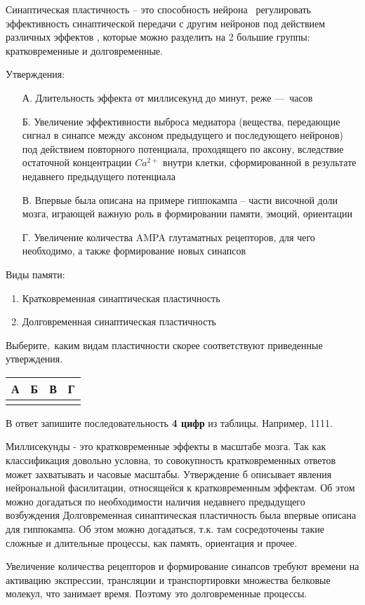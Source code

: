 
Синаптическая пластичность – это способность нейрона  регулировать эффективность синаптической передачи с другим нейронов под действием различных эффектов , которые можно разделить на 2 большие группы: кратковременные и долговременные.

Утверждения:
\begin{enumerate}
    \item[А.] Длительность эффекта от миллисекунд до минут, реже — часов
    \item[Б.] Увеличение эффективности выброса медиатора (вещества, передающие сигнал в синапсе между аксоном предыдущего и последующего нейронов) под действием повторного потенциала, проходящего по аксону, вследствие остаточной концентрации $Ca^{2+}$ внутри клетки, сформированной в результате недавнего предыдущего потенциала
    \item[В.] Впервые была описана на примере гиппокампа – части височной доли мозга, играющей важную роль в формировании памяти, эмоций, ориентации
    \item[Г.] Увеличение количества AMPA глутаматных рецепторов, для чего необходимо, а также формирование новых синапсов
\end{enumerate} 

Виды памяти:
\begin{enumerate}
    \item Кратковременная синаптическая пластичность
    \item Долговременная синаптическая пластичность
\end{enumerate}

Выберите, каким видам пластичности скорее соответствуют приведенные утверждения.

\begin{tabular}{|p{1.5cm}|p{1.5cm}|p{1.5cm}|p{1.5cm}|}
    \hline
    А&Б&В&Г\\
    \hline
    &&&\\
    \hline
\end{tabular}

В ответ запишите последовательность \textbf{4 цифр} из таблицы. Например, 1111.

\explanationSection

Миллисекунды - это кратковременные эффекты в масштабе мозга. Так как классификация довольно условна, то совокупность кратковременных ответов может захватывать и часовые масштабы. 
Утверждение б описывает явления нейрональной фасилитации, относящейся к кратковременным эффектам. Об этом можно догадаться по необходимости наличия недавнего предыдущего возбуждения
Долговременная синаптическая пластичность была впервые описана для гиппокампа. Об этом можно догадаться, т.к. там сосредоточены такие сложные и длительные процессы, как память, ориентация и прочее.

Увеличение количества рецепторов и формирование синапсов требуют времени на активацию экспрессии, трансляции и транспортировки множества белковые молекул, что занимает время. Поэтому это долговременные процессы.

